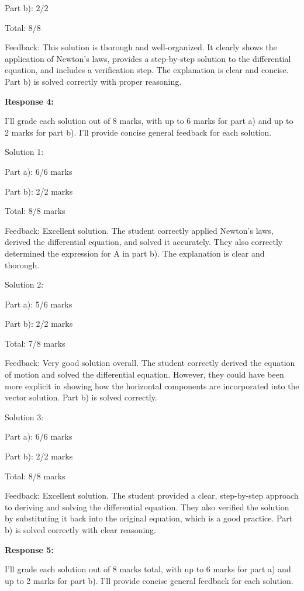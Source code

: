 \documentclass[a4paper,11pt]{article}
\begin{document}
Part b): 2/2

Total: 8/8

Feedback: This solution is thorough and well-organized. It clearly shows the application of Newton's laws, provides a step-by-step solution to the differential equation, and includes a verification step. The explanation is clear and concise. Part b) is solved correctly with proper reasoning.

\bigskip
\textbf{Response 4:}

I'll grade each solution out of 8 marks, with up to 6 marks for part a) and up to 2 marks for part b). I'll provide concise general feedback for each solution.

Solution 1:

Part a): 6/6 marks

Part b): 2/2 marks

Total: 8/8 marks

Feedback: Excellent solution. The student correctly applied Newton's laws, derived the differential equation, and solved it accurately. They also correctly determined the expression for A in part b). The explanation is clear and thorough.

Solution 2:

Part a): 5/6 marks

Part b): 2/2 marks

Total: 7/8 marks

Feedback: Very good solution overall. The student correctly derived the equation of motion and solved the differential equation. However, they could have been more explicit in showing how the horizontal components are incorporated into the vector solution. Part b) is solved correctly.

Solution 3:

Part a): 6/6 marks

Part b): 2/2 marks

Total: 8/8 marks

Feedback: Excellent solution. The student provided a clear, step-by-step approach to deriving and solving the differential equation. They also verified the solution by substituting it back into the original equation, which is a good practice. Part b) is solved correctly with clear reasoning.

\bigskip
\textbf{Response 5:}

I'll grade each solution out of 8 marks total, with up to 6 marks for part a) and up to 2 marks for part b). I'll provide concise general feedback for each solution.
\end{document}
